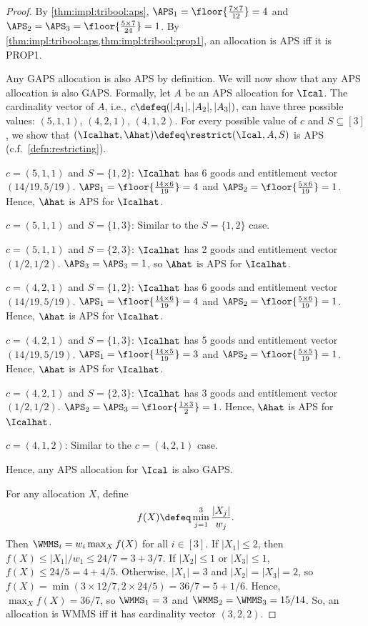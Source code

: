 \begin{proof}
By \cref{thm:impl:tribool:aps}, $\APS_1 = \floor{\frac{7 \times 7}{12}} = 4$
and $\APS_2 = \APS_3 = \floor{\frac{5 \times 7}{24}} = 1$.
By \cref{thm:impl:tribool:aps,thm:impl:tribool:prop1},
an allocation is APS iff it is PROP1.

Any GAPS allocation is also APS by definition.
We will now show that any APS allocation is also GAPS.
Formally, let $A$ be an APS allocation for $\Ical$.
The cardinality vector of $A$, i.e., $c \defeq (|A_1|, |A_2|, |A_3|)$,
can have three possible values: $(5, 1, 1)$, $(4, 2, 1)$, $(4, 1, 2)$.
For every possible value of $c$ and $S \subseteq [3]$,
we show that $(\Icalhat, \Ahat) \defeq \restrict(\Ical, A, S)$ is APS
(c.f.~\cref{defn:restricting}).
\begin{tightenum}
\item $c = (5, 1, 1)$ and $S = \{1, 2\}$:
    $\Icalhat$ has 6 goods and entitlement vector $(14/19, 5/19)$.
    $\APS_1 = \floor{\frac{14 \times 6}{19}} = 4$ and $\APS_2 = \floor{\frac{5 \times 6}{19}} = 1$.
    Hence, $\Ahat$ is APS for $\Icalhat$.
\item $c = (5, 1, 1)$ and $S = \{1, 3\}$:
    Similar to the $S = \{1, 2\}$ case.
\item $c = (5, 1, 1)$ and $S = \{2, 3\}$:
    $\Icalhat$ has 2 goods and entitlement vector $(1/2, 1/2)$.
    $\APS_3 = \APS_3 = 1$, so $\Ahat$ is APS for $\Icalhat$.
\item $c = (4, 2, 1)$ and $S = \{1, 2\}$:
    $\Icalhat$ has 6 goods and entitlement vector $(14/19, 5/19)$.
    $\APS_1 = \floor{\frac{14 \times 6}{19}} = 4$ and $\APS_2 = \floor{\frac{5 \times 6}{19}} = 1$.
    Hence, $\Ahat$ is APS for $\Icalhat$.
\item $c = (4, 2, 1)$ and $S = \{1, 3\}$:
    $\Icalhat$ has 5 goods and entitlement vector $(14/19, 5/19)$.
    $\APS_1 = \floor{\frac{14 \times 5}{19}} = 3$ and $\APS_2 = \floor{\frac{5 \times 5}{19}} = 1$.
    Hence, $\Ahat$ is APS for $\Icalhat$.
\item $c = (4, 2, 1)$ and $S = \{2, 3\}$:
    $\Icalhat$ has 3 goods and entitlement vector $(1/2, 1/2)$.
    $\APS_2 = \APS_3 = \floor{\frac{1 \times 3}{2}} = 1$.
    Hence, $\Ahat$ is APS for $\Icalhat$.
\item $c = (4, 1, 2)$:
    Similar to the $c = (4, 2, 1)$ case.
\end{tightenum}
Hence, any APS allocation for $\Ical$ is also GAPS.

For any allocation $X$, define
\[ f(X) \defeq \min_{j=1}^3 \frac{|X_j|}{w_j}. \]
Then $\WMMS_i = w_i\max_X f(X)$ for all $i \in [3]$.
If $|X_1| \le 2$, then $f(X) \le |X_1|/w_1 \le 24/7 = 3 + 3/7$.
If $|X_2| \le 1$ or $|X_3| \le 1$, $f(X) \le 24/5 = 4 + 4/5$.
Otherwise, $|X_1| = 3$ and $|X_2| = |X_3| = 2$,
so $f(X) = \min(3 \times 12/7, 2 \times 24/5) = 36/7 = 5 + 1/6$.
Hence, $\max_X f(X) = 36/7$, so $\WMMS_1 = 3$ and $\WMMS_2 = \WMMS_3 = 15/14$.
So, an allocation is WMMS iff it has cardinality vector $(3, 2, 2)$.


\end{proof}

